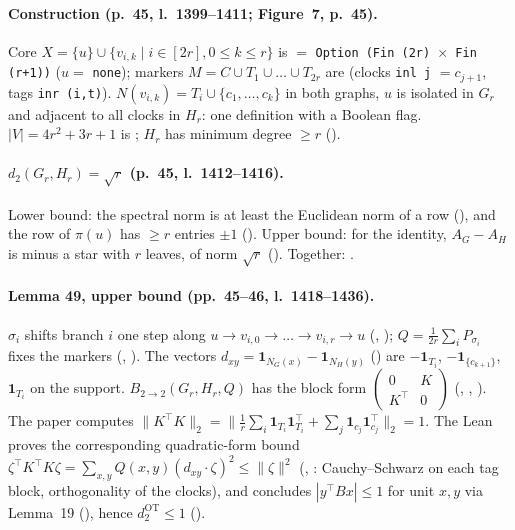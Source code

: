 \paragraph{Construction (p.~45, l.~1399--1411; Figure~7, p.~45).} Core $X=\{u\}\cup\{v_{i,k}\mid i\in[2r],0\le k\le r\}$
is  $=$ \texttt{Option (Fin (2r) $\times$ Fin (r+1))} ($u=$ \texttt{none}); markers
$M=C\cup T_1\cup\dots\cup T_{2r}$ are  (clocks \texttt{inl j} $=c_{j+1}$, tags \texttt{inr (i,t)}).
$N(v_{i,k})=T_i\cup\{c_1,\dots,c_k\}$ in both graphs, $u$ is isolated in $G_r$ and adjacent to all clocks in $H_r$:
one definition  with a Boolean flag. $|V|=4r^2+3r+1$ is ; $H_r$ has minimum degree
$\ge r$ ().

\paragraph{$d_2(G_r,H_r)=\sqrt r$ (p.~45, l.~1412--1416).} Lower bound: the spectral norm is at least the Euclidean
norm of a row (), and the row of $\pi(u)$ has $\ge r$ entries $\pm1$
(). Upper bound: for the identity, $A_G-A_H$ is minus a star with $r$ leaves, of
norm $\sqrt r$ (). Together: .

\paragraph{Lemma 49, upper bound (pp.~45--46, l.~1418--1436).} $\sigma_i$ shifts branch $i$ one step along
$u\to v_{i,0}\to\dots\to v_{i,r}\to u$ (, ); $Q=\frac1{2r}\sum_iP_{\sigma_i}$ fixes the markers
(, ). The vectors $d_{xy}=\mathbf 1_{N_{G}(x)}-\mathbf 1_{N_H(y)}$ () are
$-\mathbf 1_{T_i}$, $-\mathbf 1_{\{c_{k+1}\}}$, $\mathbf 1_{T_i}$ on the support. $B_{2\to2}(G_r,H_r,Q)$ has the block
form $\left(\begin{smallmatrix}0&K\\K^\top&0\end{smallmatrix}\right)$ (, ,
). The paper computes $\|K^\top K\|_2=\|\frac1r\sum_i\mathbf 1_{T_i}\mathbf 1_{T_i}^\top+\sum_j
\mathbf 1_{c_j}\mathbf 1_{c_j}^\top\|_2=1$. The Lean proves the corresponding quadratic-form bound
$\zeta^\top K^\top K\zeta=\sum_{x,y}Q(x,y)(d_{xy}\cdot\zeta)^2\le\|\zeta\|^2$ (,
: Cauchy--Schwarz on each tag block, orthogonality of the clocks), and concludes
$|y^\top Bx|\le1$ for unit $x,y$ via Lemma~19 (), hence $d^{\mathrm{OT}}_2\le1$
().

